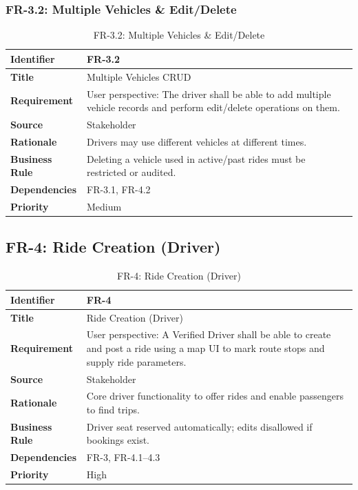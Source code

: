 \subsubsection{FR-3.2: Multiple Vehicles \& Edit/Delete}

\begin{longtable}{|p{3cm}|p{12cm}|}
\caption{FR-3.2: Multiple Vehicles \& Edit/Delete}
\label{tab:fr-3-2} \\
\hline
\rowcolor{lightgray!30}
\textbf{Identifier} & FR-3.2 \\
\hline
\textbf{Title} & Multiple Vehicles CRUD \\
\hline
\textbf{Requirement} & User perspective: The driver shall be able to add multiple vehicle records and perform edit/delete operations on them. \\
\hline
\textbf{Source} & Stakeholder \\
\hline
\textbf{Rationale} & Drivers may use different vehicles at different times. \\
\hline
\textbf{Business Rule} & Deleting a vehicle used in active/past rides must be restricted or audited. \\
\hline
\textbf{Dependencies} & FR-3.1, FR-4.2 \\
\hline
\textbf{Priority} & Medium \\
\hline
\end{longtable}

\subsection{FR-4: Ride Creation (Driver)}

\begin{longtable}{|p{3cm}|p{12cm}|}
\caption{FR-4: Ride Creation (Driver)}
\label{tab:fr-4} \\
\hline
\rowcolor{lightgray!30}
\textbf{Identifier} & FR-4 \\
\hline
\textbf{Title} & Ride Creation (Driver) \\
\hline
\textbf{Requirement} & User perspective: A Verified Driver shall be able to create and post a ride using a map UI to mark route stops and supply ride parameters. \\
\hline
\textbf{Source} & Stakeholder \\
\hline
\textbf{Rationale} & Core driver functionality to offer rides and enable passengers to find trips. \\
\hline
\textbf{Business Rule} & Driver seat reserved automatically; edits disallowed if bookings exist. \\
\hline
\textbf{Dependencies} & FR-3, FR-4.1–4.3 \\
\hline
\textbf{Priority} & High \\
\hline
\end{longtable}

